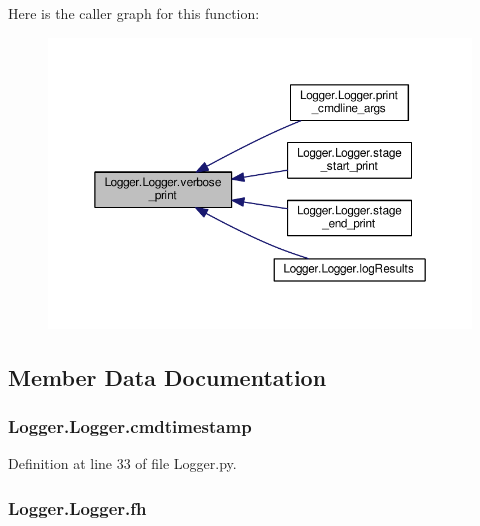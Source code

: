 Here is the caller graph for this function\-:
\nopagebreak
\begin{figure}[H]
\begin{center}
\leavevmode
\includegraphics[width=350pt]{class_logger_1_1_logger_a8c05e25fb36679fae21ab8910eb6d117_icgraph}
\end{center}
\end{figure}




\subsection{Member Data Documentation}
\hypertarget{class_logger_1_1_logger_a6424ebff90f965d7c6e4e8d7303bc3e2}{
\subsubsection[{cmdtimestamp}]{\setlength{\rightskip}{0pt plus 5cm}Logger.\-Logger.\-cmdtimestamp}}\label{class_logger_1_1_logger_a6424ebff90f965d7c6e4e8d7303bc3e2}


Definition at line 33 of file Logger.\-py.

\hypertarget{class_logger_1_1_logger_a68875fbff44820c122a69fee38bad238}{
\subsubsection[{fh}]{\setlength{\rightskip}{0pt plus 5cm}Logger.\-Logger.\-fh}}\label{class_logger_1_1_logger_a68875fbff44820c122a69fee38bad238}


